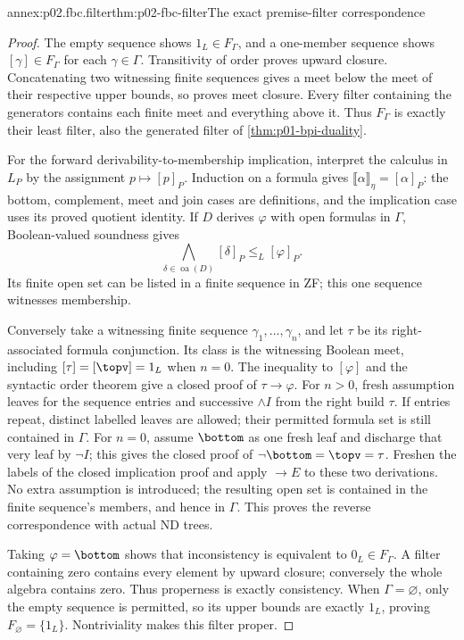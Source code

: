 \begin{annexitem}{annex:p02.fbc.filter}{thm:p02-fbc-filter}{The exact premise-filter correspondence}
\begin{proof}
The empty sequence shows \(1_L\in F_\Gamma\), and a one-member
sequence shows \([\gamma]\in F_\Gamma\) for each \(\gamma\in\Gamma\).
Transitivity of order proves upward closure.
Concatenating two witnessing finite sequences gives a meet below the
meet of their respective upper bounds, so proves meet closure.
Every filter containing the generators contains each finite meet and
everything above it. Thus \(F_\Gamma\) is exactly their least filter,
also the generated filter of \cref{thm:p01-bpi-duality}.

For the forward derivability-to-membership implication, interpret the
calculus in \(L_P\) by the assignment \(p\mapsto[p]_P\).
Induction on a formula gives
\(\llbracket\alpha\rrbracket_\eta=[\alpha]_P\): the bottom,
complement, meet and join cases are definitions, and the implication
case uses its proved quotient identity.
If \(D\) derives \(\varphi\) with open formulas in \(\Gamma\),
Boolean-valued soundness gives
\[
 \bigwedge_{\delta\in\operatorname{oa}(D)}[\delta]_P
                                  \leq_L[\varphi]_P .
\]
Its finite open set can be listed in a finite sequence in ZF;
this one sequence witnesses membership.

Conversely take a witnessing finite sequence
\(\gamma_1,\ldots,\gamma_n\), and let \(\tau\) be its
right-associated formula conjunction.
Its class is the witnessing Boolean meet, including
\([\tau]=[\topv]=1_L\) when \(n=0\).
The inequality to \([\varphi]\) and the syntactic order theorem
give a closed proof of \(\tau\to\varphi\).
For \(n>0\), fresh assumption leaves for the sequence entries and
successive \(\land I\) from the right build \(\tau\).
If entries repeat, distinct labelled leaves are allowed; their
permitted formula set is still contained in \(\Gamma\).
For \(n=0\), assume \(\bottom\) as one fresh leaf and discharge
that very leaf by \(\neg I\); this gives the closed proof
of \(\neg\bottom=\topv=\tau\).
Freshen the labels of the closed implication proof and apply
\(\to E\) to these two derivations.
No extra assumption is introduced; the resulting open set is
contained in the finite sequence's members, and hence in \(\Gamma\).
This proves the reverse correspondence with actual ND trees.

Taking \(\varphi=\bottom\) shows that inconsistency is equivalent
to \(0_L\in F_\Gamma\). A filter containing zero contains every
element by upward closure; conversely the whole algebra contains zero.
Thus properness is exactly consistency.
When \(\Gamma=\varnothing\), only the empty sequence is permitted,
so its upper bounds are exactly \(1_L\), proving
\(F_\varnothing=\{1_L\}\). Nontriviality makes this filter proper.
\end{proof}
\end{annexitem}

